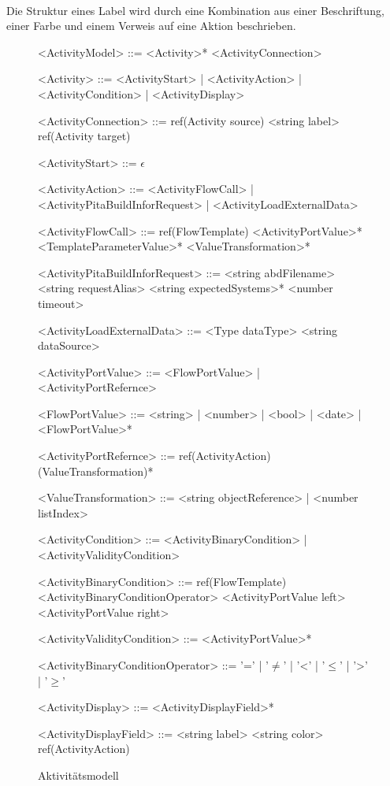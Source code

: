     \\
    Die Struktur eines Label wird durch eine Kombination aus einer Beschriftung, einer Farbe und einem Verweis auf eine Aktion beschrieben.
    \begin{figure}[H]
        \centering
        \begin{grammar}
            <ActivityModel> ::= <Activity>* <ActivityConnection>

            <Activity> ::= <ActivityStart>
            | <ActivityAction>
            | <ActivityCondition>
            | <ActivityDisplay>

            <ActivityConnection> ::= ref(Activity source) <string label> ref(Activity target)

            <ActivityStart> ::= $\epsilon$

            <ActivityAction> ::= <ActivityFlowCall>
            | <ActivityPitaBuildInforRequest>
            | <ActivityLoadExternalData>

            <ActivityFlowCall> ::= ref(FlowTemplate) <ActivityPortValue>* <TemplateParameterValue>* <ValueTransformation>*

            <ActivityPitaBuildInforRequest> ::= <string abdFilename> <string requestAlias> <string expectedSystems>* <number timeout>

            <ActivityLoadExternalData> ::= <Type dataType> <string dataSource>

            <ActivityPortValue> ::= <FlowPortValue>
            | <ActivityPortRefernce>

            <FlowPortValue> ::= <string>
            | <number>
            | <bool>
            | <date>
            | <FlowPortValue>*

            <ActivityPortRefernce> ::= ref(ActivityAction) (ValueTransformation)*

            <ValueTransformation> ::= <string objectReference>
            | <number listIndex>

            <ActivityCondition> ::= <ActivityBinaryCondition>
            | <ActivityValidityCondition>

            <ActivityBinaryCondition> ::= ref(FlowTemplate) <ActivityBinaryConditionOperator> <ActivityPortValue left> <ActivityPortValue right>

            <ActivityValidityCondition> ::= <ActivityPortValue>*

            <ActivityBinaryConditionOperator> ::= '='
            | '$\neq$' 
            | '\textless' 
            | '$\leq$' 
            | '\textgreater' 
            | '$\geq$'

            <ActivityDisplay> ::= <ActivityDisplayField>*

            <ActivityDisplayField> ::= <string label> <string color> ref(ActivityAction)
        \end{grammar}       
        \caption{Aktivitätsmodell}
        \label{gra:aktivitaetsmodell}
    \end{figure}
